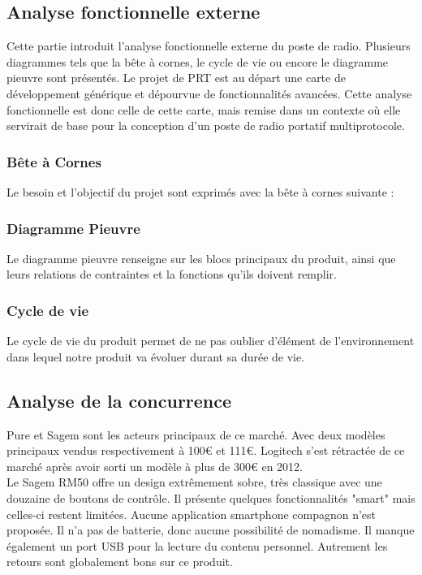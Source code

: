     \subsection{Analyse fonctionnelle externe}
    	Cette partie introduit l'analyse fonctionnelle externe du poste de radio.
        Plusieurs diagrammes tels que la bête à cornes, le cycle de vie ou encore le diagramme pieuvre sont présentés.
        Le projet de PRT est au départ une carte de développement générique et dépourvue de fonctionnalités avancées. Cette analyse fonctionnelle est donc celle de cette carte, mais remise dans un contexte où elle servirait de base pour la conception d'un poste de radio portatif multiprotocole. 
    
    	\subsubsection{Bête à Cornes}
        Le besoin et l'objectif du projet sont exprimés avec la bête à cornes suivante :

        \subsubsection{Diagramme Pieuvre}
        	Le diagramme pieuvre renseigne sur les blocs principaux du produit, ainsi que leurs relations de contraintes et la fonctions qu'ils doivent remplir.
			
            
            \subsubsection{Cycle de vie}
        	Le cycle de vie du produit permet de ne pas oublier d'élément de l'environnement dans lequel notre produit va évoluer durant sa durée de vie.
            
    \subsection{Analyse de la concurrence}
    	Pure et Sagem sont les acteurs principaux de ce marché. Avec deux modèles principaux vendus respectivement à 100\euro{} et 111\euro{}.
        Logitech s'est rétractée de ce marché après avoir sorti un modèle à plus de 300\euro{} en 2012. 
\\Le Sagem RM50 offre un design extrêmement sobre, très classique avec une douzaine de boutons de contrôle.
Il présente quelques fonctionnalités "smart" mais celles-ci restent limitées. Aucune application smartphone compagnon n'est proposée.
Il n'a pas de batterie, donc aucune possibilité de nomadisme. Il manque également un port USB pour la lecture du contenu personnel.
Autrement les retours sont globalement bons sur ce produit.


